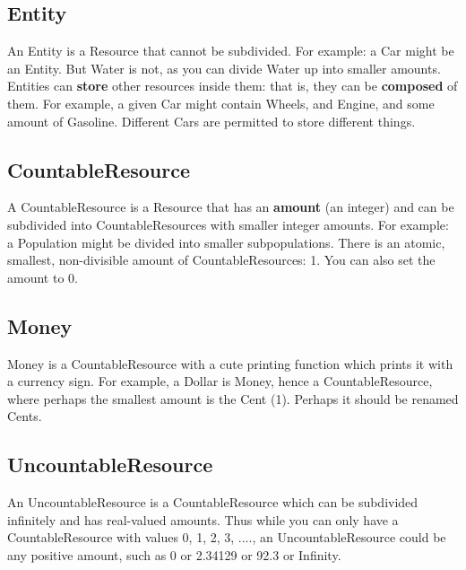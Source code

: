 \documentclass[twoside,10pt]{book}
\begin{document}
\subsection{Entity}

An Entity is a Resource that cannot be subdivided.  For example: a Car might be an Entity.  But Water is not, as you can divide Water up into smaller amounts.  Entities can {\bf store} other resources inside them: that is, they can be {\bf composed} of them.  For example, a given Car might contain Wheels, and Engine, and some amount of Gasoline.  Different Cars are permitted to store different things.

\subsection{CountableResource}

A CountableResource is a Resource that has an {\bf amount} (an integer) and can be subdivided into CountableResources with smaller integer amounts.  For example: a Population might be divided into smaller subpopulations.  There is an atomic, smallest, non-divisible amount of CountableResources: 1.  You can also set the amount to 0.

\subsection{Money}

Money is a CountableResource with a cute printing function which prints it with a currency sign.  For example, a Dollar is Money, hence a CountableResource, where perhaps the smallest amount is the Cent (1).  Perhaps it should be renamed Cents.

\subsection{UncountableResource}

An UncountableResource is a CountableResource which can be subdivided infinitely and has real-valued amounts.  Thus while you can only have a CountableResource with values 0, 1, 2, 3, ...., an UncountableResource could be any positive amount, such as 0 or 2.34129 or 92.3 or Infinity.
\end{document}
